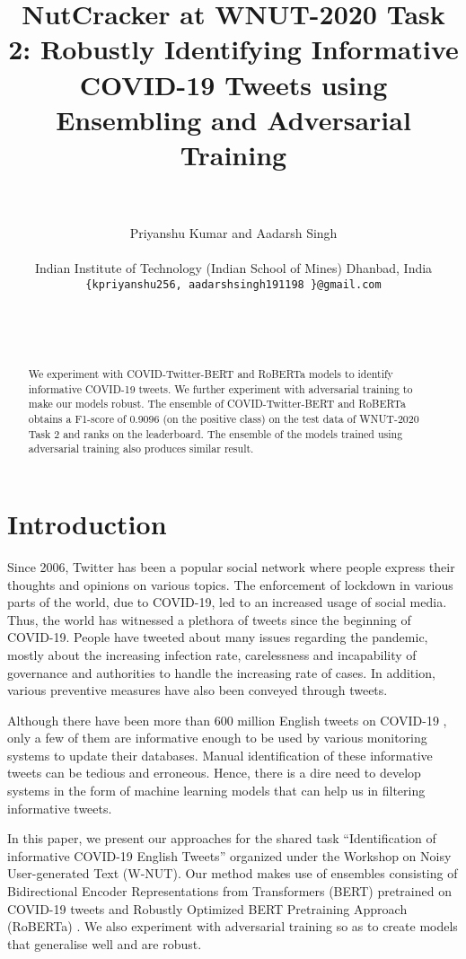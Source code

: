 \documentclass[11pt,a4paper]{article}
\title{NutCracker at WNUT-2020 Task 2: Robustly Identifying Informative COVID-19 Tweets using Ensembling and Adversarial Training}
\author{
\\
  \\
  \And
  Priyanshu Kumar and Aadarsh Singh \\
  \\
  Indian Institute of Technology (Indian School of Mines) Dhanbad, India \\
  {\tt \{kpriyanshu256, aadarshsingh191198 \}@gmail.com} \\
  \And
  \\
  \\
  \\}
\date{}
\begin{document}
\maketitle
\begin{abstract}
We experiment with COVID-Twitter-BERT and RoBERTa models to identify informative COVID-19 tweets. We further experiment with adversarial training to make our models robust. The ensemble of COVID-Twitter-BERT and RoBERTa obtains a F1-score of 0.9096 (on the positive class) on the test data of WNUT-2020 Task 2 and ranks  on the leaderboard. The ensemble of the models trained using adversarial training also produces similar result.
\end{abstract}

\section{Introduction}

Since 2006, Twitter has been a popular social network where people express their thoughts and opinions on various topics. The enforcement of lockdown in various parts of the world, due to COVID-19, led to an increased usage of social media. Thus, the world has witnessed a plethora of tweets since the beginning of COVID-19. People have tweeted about many issues regarding the pandemic, mostly about the increasing infection rate, carelessness and incapability of governance and authorities to handle the increasing rate of cases. In addition, various preventive measures have also been conveyed through tweets. 

Although there have been more than 600 million English tweets on COVID-19 \citep{lamsal2020corona} , only a few of them are informative enough to be used by various monitoring systems to update their databases. Manual identification of these informative tweets can be tedious and erroneous. Hence, there is a dire need to develop systems in the form of machine learning models that can help us in filtering informative tweets.

In this paper, we present our approaches for the shared task “Identification of informative COVID-19 English Tweets” organized under the Workshop on Noisy User-generated Text (W-NUT). Our method makes use of ensembles consisting of Bidirectional Encoder Representations from Transformers (BERT) \citep{devlin2018bert} pretrained on COVID-19 tweets \citep{muller2020covid} and Robustly Optimized BERT Pretraining Approach (RoBERTa) \citep{liu2019roberta}. We also experiment with adversarial training so as to create models that generalise well and are robust. 
\end{document}
